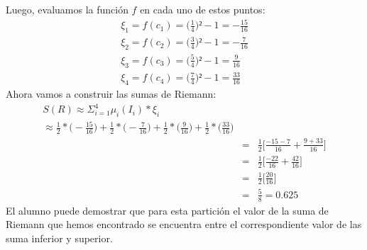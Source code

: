 \begin{ejer}[2]
		    Luego, evaluamos la función $f$ en cada uno de estos puntos:
		    \begin{eqnarray}
		        \xi_1 = f(c_1) = \Big(\frac{1}{4}\Big)² -1 = -\frac{15}{16} \\
		        \xi_2 = f(c_2) = \Big(\frac{3}{4}\Big)² -1 = -\frac{7}{16} \\
		        \xi_3 = f(c_3) = \Big(\frac{5}{4}\Big)² -1 = \frac{9}{16} \\
		        \xi_4 = f(c_4) = \Big(\frac{7}{4}\Big)² -1 = \frac{33}{16}
		    \end{eqnarray}
		    Ahora vamos a construir las sumas de Riemann: 
		    \begin{eqnarray*}
			    S(R) \approx \Sigma_{i=1}^4 \mu_i (I_i) * \xi_i \\ 
			    \approx \frac{1}{2}*\Big(-\frac{15}{16}\Big) + \frac{1}{2}*\Big(-\frac{7}{16} \Big) + \frac{1}{2}*\Big(\frac{9}{16} \Big) + \frac{1}{2}*\Big(\frac{33}{16} \Big) \\ 
			    &=& \frac{1}{2}\Big[\frac{-15-7}{16} + \frac{9+33}{16} \Big]\\ 
			    &=& \frac{1}{2}\Big[\frac{-22}{16} + \frac{42}{16} \Big]\\ 
			    &=& \frac{1}{2}\Big[\frac{20}{16} \Big] \\ 
			    &=& \frac{5}{8} = 0.625
		    \end{eqnarray*}
		    El alumno puede demostrar que para esta partición el valor de la suma de Riemann que hemos encontrado se encuentra entre el correspondiente valor de las suma inferior y superior. 
			\end{ejer}
